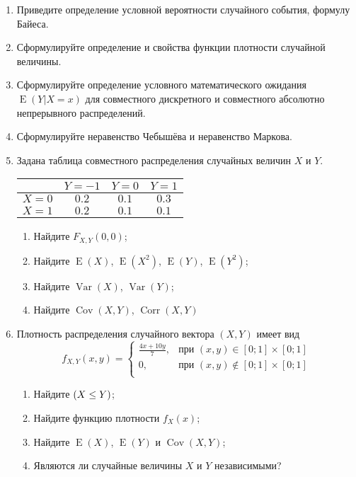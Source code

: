 \documentclass[11pt]{article} %
\DeclareMathOperator{\Cov}{Cov}
\DeclareMathOperator{\Corr}{Corr}
\DeclareMathOperator{\Var}{Var}
\DeclareMathOperator{\E}{E}
\let\P\relax
\DeclareMathOperator{\P}{\mathbb{P}}
\begin{document}
\begin{enumerate}
\item Приведите определение условной вероятности случайного события, формулу Байеса.
\item Сформулируйте определение и свойства функции плотности случайной величины. 
\item Сформулируйте определение  условного математического ожидания $\E(Y|X=x)$ для совместного дискретного и совместного абсолютно непрерывного распределений.
\item Сформулируйте неравенство Чебышёва и неравенство Маркова.

\item Задана таблица совместного распределения случайных величин $X$ и $Y$.
\begin{center}
\begin{tabular}{lccc}
\toprule
                       & $Y=-1$  & $Y=0$   & $Y=1$   \\ 
 \midrule
$X=0$                 & $0.2$ & $0.1$ & $0.3$ \\
 $X=1$                 & $0.2$ & $0.1$ & $0.1$ \\ 
 \bottomrule
\end{tabular}
\end{center}


\begin{enumerate}
    \item Найдите $F_{X,Y}(0, 0)$;
    \item Найдите $\E(X)$, $\E(X^2)$, $\E(Y)$, $\E(Y^2)$;
    \item Найдите $\Var(X)$, $\Var(Y)$;
    \item Найдите $\Cov(X, Y)$, $\Corr(X, Y)$
\end{enumerate}    
\item Плотность распределения случайного вектора $(X,Y)$ имеет вид
\[
f_{X,Y}(x,y) = 
\begin{cases} 
\frac{4x+10y}{7}, & \text{при } (x,y) \in [0;1] \times [0;1] \\ 
0 , & \text{при } (x,y) \not\in [0;1] \times [0;1] \\
\end{cases}
\]

\begin{enumerate}
\item Найдите $\P(X \leq Y)$;
\item Найдите функцию плотности $f_X(x)$;
\item Найдите $\E(X)$, $\E(Y)$ и $\Cov(X, Y)$;
\item Являются ли случайные величины $X$ и $Y$ независимыми?
\end{enumerate} 


\end{enumerate}
\end{document}
